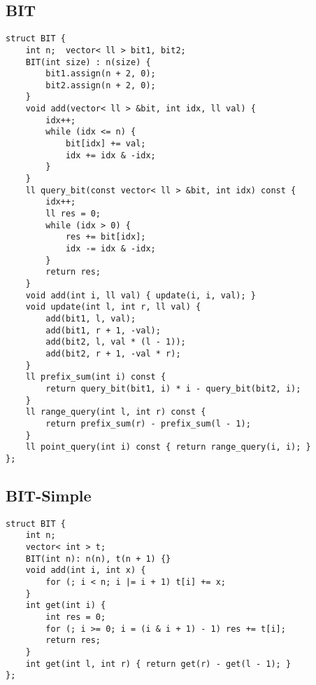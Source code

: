 \documentclass[twoside]{article}
\begin{document}
\begin{multicols*}{2}
\begin{verbatim}
\end{verbatim}

{
\subsection*{BIT}
}
\begin{verbatim}
struct BIT {
    int n;  vector< ll > bit1, bit2;
    BIT(int size) : n(size) {
        bit1.assign(n + 2, 0);
        bit2.assign(n + 2, 0);
    }
    void add(vector< ll > &bit, int idx, ll val) {
        idx++;
        while (idx <= n) {
            bit[idx] += val;
            idx += idx & -idx; 
        }
    }
    ll query_bit(const vector< ll > &bit, int idx) const {
        idx++;
        ll res = 0;
        while (idx > 0) {
            res += bit[idx];
            idx -= idx & -idx;
        }
        return res;
    }
    void add(int i, ll val) { update(i, i, val); }
    void update(int l, int r, ll val) {
        add(bit1, l, val);
        add(bit1, r + 1, -val);
        add(bit2, l, val * (l - 1));
        add(bit2, r + 1, -val * r);
    }
    ll prefix_sum(int i) const {
        return query_bit(bit1, i) * i - query_bit(bit2, i);
    }
    ll range_query(int l, int r) const {
        return prefix_sum(r) - prefix_sum(l - 1);
    }
    ll point_query(int i) const { return range_query(i, i); }
};

\end{verbatim}

{
\subsection*{BIT-Simple}
}
\begin{verbatim}
struct BIT {
    int n;
    vector< int > t;
    BIT(int n): n(n), t(n + 1) {}
    void add(int i, int x) {
        for (; i < n; i |= i + 1) t[i] += x;
    }
    int get(int i) {
        int res = 0;
        for (; i >= 0; i = (i & i + 1) - 1) res += t[i];
        return res;
    }
    int get(int l, int r) { return get(r) - get(l - 1); }
};
\end{verbatim}


\end{multicols*}
\end{document}
